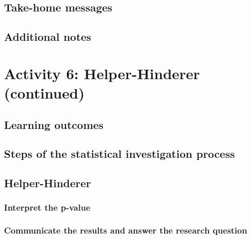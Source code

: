 \documentclass[
]{report}
\begin{document}
\hypertarget{take-home-messages-8}{%
\subsection{Take-home messages}\label{take-home-messages-8}}

\hypertarget{additional-notes-7}{%
\subsection{Additional notes}\label{additional-notes-7}}

\hypertarget{activity-6-helper-hinderer-continued}{%
\section{Activity 6: Helper-Hinderer (continued)}\label{activity-6-helper-hinderer-continued}}

\hypertarget{learning-outcomes-10}{%
\subsection{Learning outcomes}\label{learning-outcomes-10}}

\hypertarget{steps-of-the-statistical-investigation-process-2}{%
\subsection{Steps of the statistical investigation process}\label{steps-of-the-statistical-investigation-process-2}}

\hypertarget{helper-hinderer-1}{%
\subsection{Helper-Hinderer}\label{helper-hinderer-1}}

\hypertarget{interpret-the-p-value}{%
\subsubsection*{Interpret the p-value}\label{interpret-the-p-value}}

\hypertarget{communicate-the-results-and-answer-the-research-question}{%
\subsubsection*{Communicate the results and answer the research question}\label{communicate-the-results-and-answer-the-research-question}}
\end{document}
